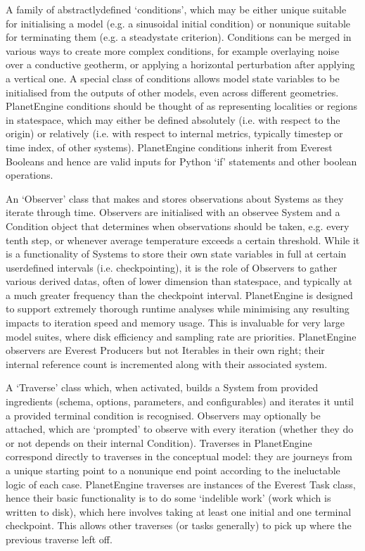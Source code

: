 \documentclass[letterpaper,10pt,english]{jupyterBook}
\begin{document}
\sphinxAtStartPar
A family of abstractly\sphinxhyphen{}defined ‘conditions’, which may be either unique \sphinxhyphen{} suitable for initialising a model (e.g. a sinusoidal initial condition) \sphinxhyphen{} or non\sphinxhyphen{}unique \sphinxhyphen{} suitable for terminating them (e.g. a steady\sphinxhyphen{}state criterion). Conditions can be merged in various ways to create more complex conditions, for example overlaying noise over a conductive geotherm, or applying a horizontal perturbation after applying a vertical one. A special class of conditions allows model state variables to be initialised from the outputs of other models, even across different geometries. PlanetEngine conditions should be thought of as representing localities or regions in state\sphinxhyphen{}space, which may either be defined absolutely (i.e. with respect to the origin) or relatively (i.e. with respect to internal metrics, typically timestep or time index, of other systems). PlanetEngine conditions inherit from Everest Booleans and hence are valid inputs for Python ‘if’ statements and other boolean operations.

\sphinxAtStartPar
An ‘Observer’ class that makes and stores observations about Systems as they iterate through time. Observers are initialised with an observee System and a Condition object that determines when observations should be taken, e.g. every tenth step, or whenever average temperature exceeds a certain threshold. While it is a functionality of Systems to store their own state variables in full at certain user\sphinxhyphen{}defined intervals (i.e. checkpointing), it is the role of Observers to gather various derived datas, often of lower dimension than state\sphinxhyphen{}space, and typically at a much greater frequency than the checkpoint interval. PlanetEngine is designed to support extremely thorough runtime analyses while minimising any resulting impacts to iteration speed and memory usage. This is invaluable for very large model suites, where disk efficiency and sampling rate are priorities. PlanetEngine observers are Everest Producers but not Iterables in their own right; their internal reference count is incremented along with their associated system.

\sphinxAtStartPar
A ‘Traverse’ class which, when activated, builds a System from provided ingredients (schema, options, parameters, and configurables) and iterates it until a provided terminal condition is recognised. Observers may optionally be attached, which are ‘prompted’ to observe with every iteration (whether they do or not depends on their internal Condition). Traverses in PlanetEngine correspond directly to traverses in the conceptual model: they are journeys from a unique starting point to a non\sphinxhyphen{}unique end point according to the ineluctable logic of each case. PlanetEngine traverses are instances of the Everest Task class, hence their basic functionality is to do some ‘indelible work’ (work which is written to disk), which here involves taking at least one initial and one terminal checkpoint. This allows other traverses (or tasks generally) to pick up where the previous traverse left off.
\end{document}
